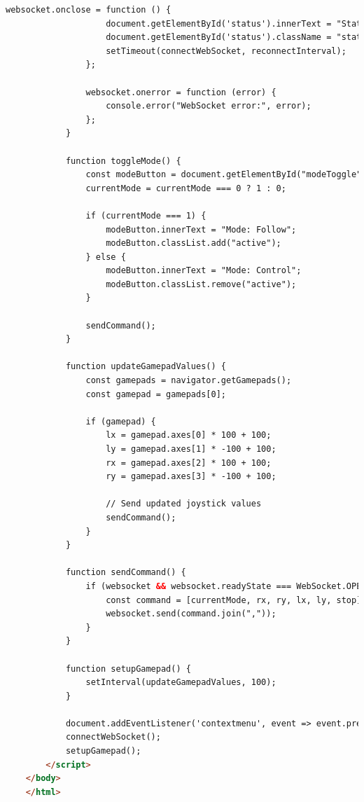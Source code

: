\begin{lstlisting}[language=HTML, caption=UI.txt]
                websocket.onclose = function () {
                    document.getElementById('status').innerText = "Status: Disconnected";
                    document.getElementById('status').className = "status disconnected";
                    setTimeout(connectWebSocket, reconnectInterval);
                };
    
                websocket.onerror = function (error) {
                    console.error("WebSocket error:", error);
                };
            }
    
            function toggleMode() {
                const modeButton = document.getElementById("modeToggle");
                currentMode = currentMode === 0 ? 1 : 0;
    
                if (currentMode === 1) {
                    modeButton.innerText = "Mode: Follow";
                    modeButton.classList.add("active");
                } else {
                    modeButton.innerText = "Mode: Control";
                    modeButton.classList.remove("active");
                }
    
                sendCommand();
            }
    
            function updateGamepadValues() {
                const gamepads = navigator.getGamepads();
                const gamepad = gamepads[0];
    
                if (gamepad) {
                    lx = gamepad.axes[0] * 100 + 100;
                    ly = gamepad.axes[1] * -100 + 100;
                    rx = gamepad.axes[2] * 100 + 100;
                    ry = gamepad.axes[3] * -100 + 100;
    
                    // Send updated joystick values
                    sendCommand();
                }
            }
    
            function sendCommand() {
                if (websocket && websocket.readyState === WebSocket.OPEN) {
                    const command = [currentMode, rx, ry, lx, ly, stop];
                    websocket.send(command.join(","));
                }
            }
    
            function setupGamepad() {
                setInterval(updateGamepadValues, 100);
            }
    
            document.addEventListener('contextmenu', event => event.preventDefault());
            connectWebSocket();
            setupGamepad();
        </script>
    </body>
    </html>
\end{lstlisting}

